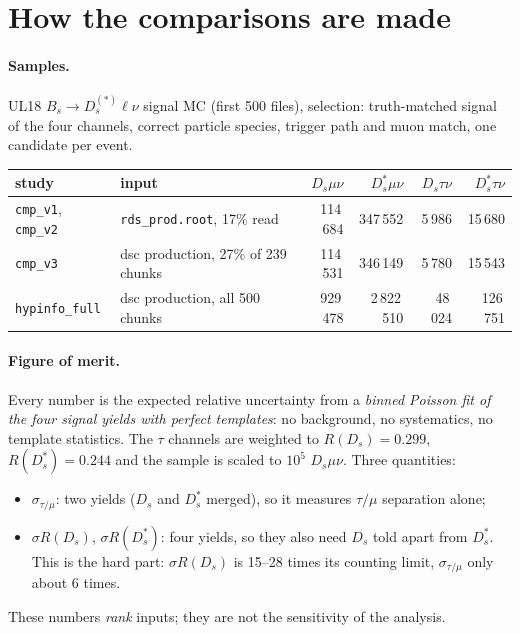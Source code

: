\documentclass[10pt,a4paper]{article}
\newcommand{\code}[1]{\texttt{#1}}
\newcommand{\Ds}{D_s}
\newcommand{\Dss}{D_s^*}
\newcommand{\sR}{\sigma R}
\begin{document}
\section{How the comparisons are made}
\label{sec:method}

\paragraph{Samples.} UL18 $B_s\to\Ds^{(*)}\ell\nu$ signal MC (first 500 files), selection: truth-matched signal of the
four channels, correct particle species, trigger path and muon match, one candidate per event.

\begin{center}
\small
\begin{tabular}{llrrrr}
\toprule
study & input & $\Ds\mu\nu$ & $\Dss\mu\nu$ & $\Ds\tau\nu$ & $\Dss\tau\nu$ \\
\midrule
\code{cmp\_v1}, \code{cmp\_v2} & \code{rds\_prod.root}, 17\% read & 114\,684 & 347\,552 & 5\,986 & 15\,680 \\
\code{cmp\_v3} & dsc production, 27\% of 239 chunks & 114\,531 & 346\,149 & 5\,780 & 15\,543 \\
\code{hypinfo\_full} & dsc production, all 500 chunks & 929\,478 & 2\,822\,510 & 48\,024 & 126\,751 \\
\bottomrule
\end{tabular}
\end{center}

\paragraph{Figure of merit.} Every number is the expected relative uncertainty from a \emph{binned Poisson fit of the
four signal yields with perfect templates}: no background, no systematics, no template statistics. The $\tau$ channels
are weighted to $R(\Ds)=0.299$, $R(\Dss)=0.244$ and the sample is scaled to $10^5$ $\Ds\mu\nu$. Three quantities:
\begin{itemize}
\item $\sigma_{\tau/\mu}$: two yields ($\Ds$ and $\Dss$ merged), so it measures $\tau/\mu$ separation alone;
\item $\sR(\Ds)$, $\sR(\Dss)$: four yields, so they also need $\Ds$ told apart from $\Dss$. This is the hard part:
  $\sR(\Ds)$ is 15--28 times its counting limit, $\sigma_{\tau/\mu}$ only about 6 times.
\end{itemize}
These numbers \emph{rank} inputs; they are not the sensitivity of the analysis.
\end{document}
